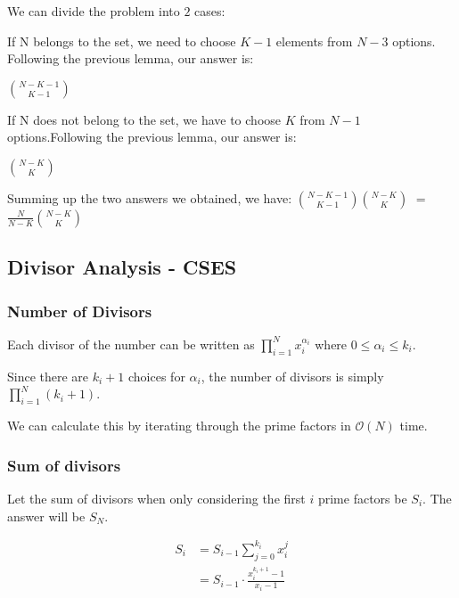             We can divide the problem into $2$ cases:

            If N belongs to the set, we need to choose $K-1$ elements from $N-3$ options. Following the previous lemma, our answer is:
            
            $\binom{N-K-1}{K-1}$
            
            
            If N does not belong to the set, we have to choose $K$ from $N-1$ options.Following the previous lemma, our answer is:
            
            $\binom{N-K}{K}$

            
            Summing up the two answers we obtained, we have:  $\binom{N-K-1}{K-1}\binom{N-K}{K}$ $=$ $\frac{N}{N-K}\binom{N-K}{K}$
        \subsection{Divisor Analysis - CSES} 
            \subsubsection{Number of Divisors}
                    Each divisor of the number can be written as $\prod_{i = 1}^N x_i^{\alpha_i}$
                    where $0 \leq \alpha_i \leq k_i$.
                    
                    Since there are $k_i + 1$ choices for $\alpha_i$, the number of divisors is
                    simply $\prod_{i = 1}^N (k_i + 1)$.
                    
                    We can calculate this by iterating through the prime factors in $\mathcal O(N)$
                    time.
                    
            \subsubsection{Sum of divisors}
            
                Let the sum of divisors when only considering the first $i$ prime factors be $S_i$. The answer will be $S_N$.
                
                $$\begin{aligned} S_i &= S_{i - 1} \sum_{j = 0}^{k_i} x_i^j\\ &= S_{i - 1} \cdot \frac{x_i^{k_i + 1} - 1}{x_i - 1}\\ \end{aligned}$$
                
